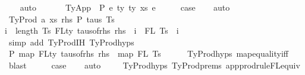 \begin{isabellebody}
\ \ \isamarkupfalse%
\ auto\isanewline
\ \ \isamarkupfalse%
\isanewline
{}\isamarkupfalse%
\isanewline
\ \ \isamarkupfalse%
\ {\isacharparenleft}{\kern0pt}TyApp\ {\isasymGamma}\ P\ e{}\ ty{}\ ty{}\ xs\ e{}{\isacharparenright}{\kern0pt}\isanewline
\ \ \isamarkupfalse%
\ \isamarkupfalse%
\ {\isacharquery}{\kern0pt}case\isanewline
\ \ \isamarkupfalse%
\ auto\isanewline
\ \ \isamarkupfalse%
\isanewline
{}\isamarkupfalse%
\isanewline
\ \ \isamarkupfalse%
\ {\isacharparenleft}{\kern0pt}TyProd\ a\ xs\ rhs\ P\ taus\ Ts\ {\isasymGamma}{\isacharparenright}{\kern0pt}\isanewline
\ \ \isamarkupfalse%
{\isachardoublequoteopen}{\isasymforall}i\ {\isacharless}{\kern0pt}\ length\ Ts{\isachardot}{\kern0pt}\ FLty\ {\isacharparenleft}{\kern0pt}taus{\isacharunderscore}{\kern0pt}of{\isacharunderscore}{\kern0pt}rhs\ rhs\ {\isacharbang}{\kern0pt}\ i{\isacharparenright}{\kern0pt}\ {\isacharequal}{\kern0pt}\ FL\ {\isacharparenleft}{\kern0pt}Ts\ {\isacharbang}{\kern0pt}\ i{\isacharparenright}{\kern0pt}{\isachardoublequoteclose}\isanewline
\ \ \ \ \ \isamarkupfalse%
\ {\isacharparenleft}{\kern0pt}simp\ add{\isacharcolon}{\kern0pt}\ TyProd{\isachardot}{\kern0pt}IH\ TyProd{\isachardot}{\kern0pt}hyps{\isacharparenleft}{\kern0pt}{}{\isacharparenright}{\kern0pt}{\isacharparenright}{\kern0pt}\isanewline
\ \ \isamarkupfalse%
\ \isamarkupfalse%
\ P{}{\isacharcolon}{\kern0pt}\ {\isachardoublequoteopen}map\ FLty\ {\isacharparenleft}{\kern0pt}taus{\isacharunderscore}{\kern0pt}of{\isacharunderscore}{\kern0pt}rhs\ rhs{\isacharparenright}{\kern0pt}\ {\isacharequal}{\kern0pt}\ map\ FL\ Ts{\isachardoublequoteclose}\isanewline
\ \ \ \ \isamarkupfalse%
\ TyProd{\isachardot}{\kern0pt}hyps{\isacharparenleft}{\kern0pt}{}{\isacharcomma}{\kern0pt}{}{\isacharparenright}{\kern0pt}\ map{\isacharunderscore}{\kern0pt}equality{\isacharunderscore}{\kern0pt}iff\ \isamarkupfalse%
\ blast\isanewline
\ \ \isamarkupfalse%
\ \isamarkupfalse%
\ {\isacharquery}{\kern0pt}case\isanewline
\ \ \isamarkupfalse%
\ auto\isanewline
\ \ \ \isamarkupfalse%
\ TyProd{\isachardot}{\kern0pt}hyps{\isacharparenleft}{\kern0pt}{}{\isacharparenright}{\kern0pt}\ TyProd{\isachardot}{\kern0pt}prems\ app{\isacharunderscore}{\kern0pt}prodrule{\isacharunderscore}{\kern0pt}FL{\isacharunderscore}{\kern0pt}equiv\ \isamarkupfalse%

\end{isabellebody}
